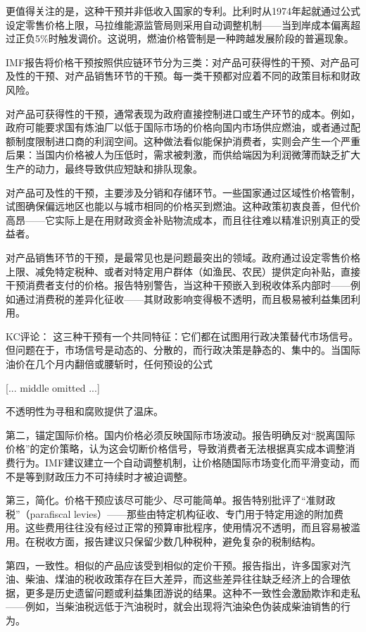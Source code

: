\documentclass[11pt]{ctexart}
\begin{document}
更值得关注的是，这种干预并非低收入国家的专利。比利时从1974年起就通过公式设定零售价格上限，马拉维能源监管局则采用自动调整机制——当到岸成本偏离超过正负5\%时触发调价。这说明，燃油价格管制是一种跨越发展阶段的普遍现象。

IMF报告将价格干预按照供应链环节分为三类：对产品可获得性的干预、对产品可及性的干预、对产品销售环节的干预。每一类干预都对应着不同的政策目标和财政风险。

对产品可获得性的干预，通常表现为政府直接控制进口或生产环节的成本。例如，政府可能要求国有炼油厂以低于国际市场的价格向国内市场供应燃油，或者通过配额制度限制进口商的利润空间。这种做法看似能保护消费者，实则会产生一个严重后果：当国内价格被人为压低时，需求被刺激，而供给端因为利润微薄而缺乏扩大生产的动力，最终导致供应短缺和排队现象。

对产品可及性的干预，主要涉及分销和存储环节。一些国家通过区域性价格管制，试图确保偏远地区也能以与城市相同的价格买到燃油。这种政策初衷良善，但代价高昂——它实际上是在用财政资金补贴物流成本，而且往往难以精准识别真正的受益者。

对产品销售环节的干预，是最常见也是问题最突出的领域。政府通过设定零售价格上限、减免特定税种、或者对特定用户群体（如渔民、农民）提供定向补贴，直接干预消费者支付的价格。报告特别警告，当这种干预嵌入到税收体系内部时——例如通过消费税的差异化征收——其财政影响变得极不透明，而且极易被利益集团利用。

KC评论： 这三种干预有一个共同特征：它们都在试图用行政决策替代市场信号。但问题在于，市场信号是动态的、分散的，而行政决策是静态的、集中的。当国际油价在几个月内翻倍或腰斩时，任何预设的公式

[... middle omitted ...]

不透明性为寻租和腐败提供了温床。

第二，锚定国际价格。国内价格必须反映国际市场波动。报告明确反对“脱离国际价格”的定价策略，认为这会切断价格信号，导致消费者无法根据真实成本调整消费行为。IMF建议建立一个自动调整机制，让价格随国际市场变化而平滑变动，而不是等到财政压力不可持续时才被迫调整。

第三，简化。价格干预应该尽可能少、尽可能简单。报告特别批评了“准财政税”（parafiscal levies）——那些由特定机构征收、专门用于特定用途的附加费用。这些费用往往没有经过正常的预算审批程序，使用情况不透明，而且容易被滥用。在税收方面，报告建议只保留少数几种税种，避免复杂的税制结构。

第四，一致性。相似的产品应该受到相似的定价干预。报告指出，许多国家对汽油、柴油、煤油的税收政策存在巨大差异，而这些差异往往缺乏经济上的合理依据，更多是历史遗留问题或利益集团游说的结果。这种不一致性会激励欺诈和走私——例如，当柴油税远低于汽油税时，就会出现将汽油染色伪装成柴油销售的行为。
\end{document}
